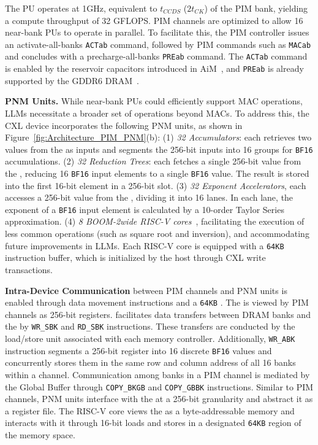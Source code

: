 The PU operates at 1GHz, equivalent to $t_{CCDS}$ ($2t_{CK}$) of the PIM bank, yielding a compute throughput of 32 GFLOPS.
PIM channels are optimized to allow 16 near-bank PUs to operate in parallel. To facilitate this, the PIM controller issues an activate-all-banks \texttt{ACTab} command, followed by PIM commands such as \texttt{MACab} and concludes with a precharge-all-banks \texttt{PREab} command. The \texttt{ACTab} command is enabled by the reservoir capacitors introduced in AiM~\cite{aim1, aim2}, and \texttt{PREab} is already supported by the GDDR6 DRAM~\cite{samsung-8gb-gddr6}.


\textbf{PNM Units.}
While near-bank PUs could efficiently support MAC operations, LLMs necessitate a broader set of operations beyond MACs. 
To address this, the CXL device incorporates the following PNM units, as shown in Figure~\ref{fig:Architecture_PIM_PNM}(b):
(1) \textit{32 Accumulators}: each retrieves two values from the \rf{} as inputs and segments the 256-bit inputs into 16 groups for \texttt{BF16} accumulations.
(2) \textit{32 Reduction Trees}: each fetches a single 256-bit value from the \rf{}, reducing 16 \texttt{BF16} input elements to a single \texttt{BF16} value. The result is stored into the first 16-bit element in a 256-bit \rf{} slot.
(3) \textit{32 Exponent Accelerators}, each accesses a 256-bit value from the \rf{}, dividing it into 16 lanes. In each lane, the exponent of a \texttt{BF16} input element is calculated by a 10-order Taylor Series approximation.
(4) \textit{8 BOOM-2wide RISC-V cores}~\cite{BOOM}, facilitating the execution of less common operations (such as square root and inversion), and accommodating future improvements in LLMs. Each RISC-V core is equipped with a \texttt{64KB} instruction buffer, which is initialized by the host through CXL write transactions.

\textbf{Intra-Device Communication} between PIM channels and PNM units is enabled through \att{} data movement instructions and a \texttt{64KB} \rf{}.
The \rf{} is viewed by PIM channels as 256-bit registers. 
\att{} facilitates data transfers between DRAM banks and the \rf{} by \texttt{WR\_SBK} and \texttt{RD\_SBK} instructions. These transfers are conducted by the load/store unit associated with each memory controller. Additionally, \texttt{WR\_ABK} instruction segments a 256-bit register into 16 discrete \texttt{BF16} values and concurrently stores them in the same row and column address of all 16 banks within a channel. Communication among banks in a PIM channel is mediated by the Global Buffer through \texttt{COPY\_BKGB} and \texttt{COPY\_GBBK} instructions. Similar to PIM channels, PNM units interface with the \rf{} at a 256-bit granularity and abstract it as a register file. The RISC-V core views the \rf{} as a byte-addressable memory and interacts with it through 16-bit loads and stores in a designated \texttt{64KB} region of the memory space.


